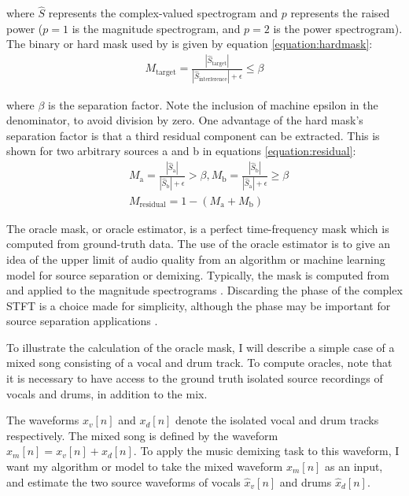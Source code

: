 \documentclass[report.tex]{subfiles}
\begin{document}
where $\hat{S}$ represents the complex-valued spectrogram and $p$ represents the raised power ($p = 1$ is the magnitude spectrogram, and $p = 2$ is the power spectrogram). The binary or hard mask used by \textcite{driedger} is given by equation \eqref{equation:hardmask}:
\begin{align}
	M_{\text{target}} = \frac{|\hat{S}_{\text{target}}|}{|\hat{S}_{\text{interference}}| + \epsilon} \le \beta\tag{17}\label{equation:hardmask}
\end{align}

where $\beta$ is the separation factor. Note the inclusion of machine epsilon in the denominator, to avoid division by zero. One advantage of the hard mask's separation factor is that a third residual component can be extracted. This is shown for two arbitrary sources a and b in equations \eqref{equation:residual}:
\begin{align}\tag{18}\label{equation:residual}
	\nonumber & M_{\text{a}} = \frac{|\hat{S}_{\text{a}}|}{|\hat{S}_{\text{b}}| + \epsilon} > \beta, M_{\text{b}} = \frac{|\hat{S}_{\text{b}}|}{|\hat{S}_{\text{a}}| + \epsilon} \ge \beta\\
	\nonumber & M_{\text{residual}} = 1 - (M_{\text{a}} + M_{\text{b}})
\end{align}

The oracle mask, or oracle estimator, is a perfect time-frequency mask which is computed from ground-truth data. The use of the oracle estimator is to give an idea of the upper limit of audio quality from an algorithm or machine learning model for source separation or demixing. Typically, the mask is computed from and applied to the magnitude spectrograms \parencite{fitzgerald1, fitzgerald2, driedger, umx, plumbley1, plumbley2}. Discarding the phase of the complex STFT is a choice made for simplicity, although the phase may be important for source separation applications \parencite{ditchphase}.

To illustrate the calculation of the oracle mask, I will describe a simple case of a mixed song consisting of a vocal and drum track. To compute oracles, note that it is necessary to have access to the ground truth isolated source recordings of vocals and drums, in addition to the mix.

The waveforms $x_{v}[n]$ and $x_{d}[n]$ denote the isolated vocal and drum tracks respectively. The mixed song is defined by the waveform $x_{m}[n] = x_{v}[n] + x_{d}[n]$. To apply the music demixing task to this waveform, I want my algorithm or model to take the mixed waveform $x_{m}[n]$ as an input, and estimate the two source waveforms of vocals $\hat{x}_{v}[n]$ and drums $\hat{x}_{d}[n]$.
\end{document}
